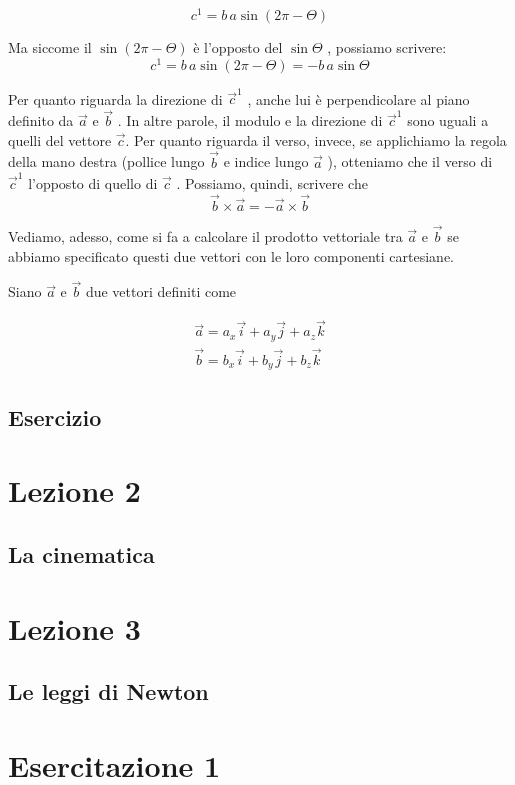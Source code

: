 \documentclass[a4paper]{book}
\begin{document}
$$ c^{1} = b\, a \sin(2 \pi - \Theta) $$

Ma siccome il $ \sin(2 \pi - \Theta) $ è l'opposto del $ \sin \Theta $ , possiamo scrivere:
$$ c^{1} = b\, a \sin(2 \pi - \Theta) = -b \, a \sin \Theta $$

Per quanto riguarda la direzione di $ \overrightarrow{c}^{1} $ , anche lui è perpendicolare al piano definito da $ \overrightarrow{a} $ e $ \overrightarrow{b} $ .
In altre parole, il modulo e la direzione di $ \overrightarrow{c}^{1} $ sono uguali a quelli del vettore $ \overrightarrow{c} $. Per quanto riguarda il verso, invece, se applichiamo la regola della mano destra (pollice lungo $\overrightarrow{b} $ e indice lungo $ \overrightarrow{a} $ ), otteniamo che il verso di $\overrightarrow{c}^{1} $ l'opposto di quello di $\overrightarrow{c} $ . Possiamo, quindi, scrivere che
$$ \overrightarrow{b} \times \overrightarrow{a} = - \overrightarrow{a} \times \overrightarrow{b} $$

Vediamo, adesso, come si fa a calcolare il prodotto vettoriale tra $ \overrightarrow{a} $ e $ \overrightarrow{b} $ se abbiamo specificato questi due vettori con le loro componenti cartesiane.

Siano $ \overrightarrow{a} $ e $\overrightarrow{b} $ due vettori definiti come

\begin{align*}
\overrightarrow{a} = a_{x} \overrightarrow{i} + a_{y} \overrightarrow{j} + a_{z}\overrightarrow{k} \\
\overrightarrow{ b} = b_{x} \overrightarrow{i} + b_{y} \overrightarrow{j} + b_{z} \overrightarrow{k} 
\end{align*}


\section{Esercizio}

\chapter{Lezione 2}
\section{La cinematica}

\chapter{Lezione 3}
\section{Le leggi di Newton}

\chapter{Esercitazione 1}
\end{document}
